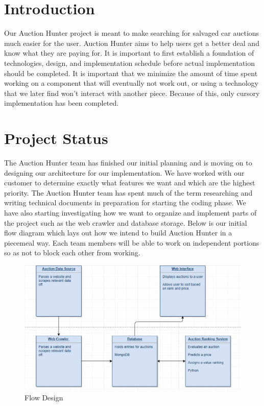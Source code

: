 \documentclass[onecolumn, draftclsnofoot,10pt, compsoc]{IEEEtran}
\begin{document}
\section{Introduction}
Our Auction Hunter project is meant to make searching for salvaged car auctions much easier for the user. Auction Hunter aims to help users get a better deal and know what they are paying for. It is important to first establish a foundation of technologies, design, and implementation schedule before actual implementation should be completed. It is important that we minimize the amount of time spent working on a component that will eventually not work out, or using a technology that we later find won't interact with another piece. Because of this, only cursory implementation has been completed. 

\section{Project Status}
The Auction Hunter team has finished our initial planning and is moving on to designing our architecture for our implementation. We have worked with our customer to determine exactly what features we want and which are the highest priority. The Auction Hunter team has spent much of the term researching and writing technical documents in preparation for starting the coding phase. We have also starting investigating how we want to organize and implement parts of the project such as the web crawler and database storage. Below is our initial flow diagram which lays out how we intend to build Auction Hunter in a piecemeal way. Each team members will be able to work on independent portions so as not to block each other from working.

\begin{figure}[ht]
\centering
\includegraphics[scale=0.75]{flow_capture}
\caption{Flow Design}
\label{fig:flow}
\end{figure}
\end{document}
